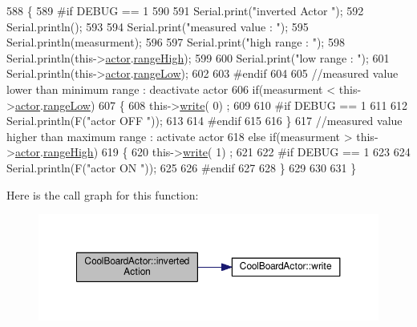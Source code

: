 \begin{DoxyCode}
588 \{
589 \textcolor{preprocessor}{#if DEBUG == 1}
590     
591     Serial.print(\textcolor{stringliteral}{"inverted Actor "});
592     Serial.println();
593 
594     Serial.print(\textcolor{stringliteral}{"measured value : "});
595     Serial.println(measurment);
596 
597     Serial.print(\textcolor{stringliteral}{"high range : "});
598     Serial.println(this->\hyperlink{class_cool_board_actor_a8f190db9f7a39fddbcef7f152da970e9}{actor}.\hyperlink{struct_cool_board_actor_1_1state_a6e5cd6c5cd44e2decfd8d4df1853f8e3}{rangeHigh});
599 
600     Serial.print(\textcolor{stringliteral}{"low range : "});
601     Serial.println(this->\hyperlink{class_cool_board_actor_a8f190db9f7a39fddbcef7f152da970e9}{actor}.\hyperlink{struct_cool_board_actor_1_1state_a43f891c9fb3bb63575c27cec860de55a}{rangeLow});
602 
603 \textcolor{preprocessor}{#endif}
604 
605     \textcolor{comment}{//measured value lower than minimum range : deactivate actor}
606     \textcolor{keywordflow}{if}(measurment < this->\hyperlink{class_cool_board_actor_a8f190db9f7a39fddbcef7f152da970e9}{actor}.\hyperlink{struct_cool_board_actor_1_1state_a43f891c9fb3bb63575c27cec860de55a}{rangeLow})
607     \{
608         this->\hyperlink{class_cool_board_actor_a958786ff01ea1056ee72c72d439f86da}{write}( 0) ;
609 
610 \textcolor{preprocessor}{    #if DEBUG == 1 }
611 
612         Serial.println(F(\textcolor{stringliteral}{"actor OFF "}));
613     
614 \textcolor{preprocessor}{    #endif}
615 
616     \}
617     \textcolor{comment}{//measured value higher than maximum range : activate actor}
618     \textcolor{keywordflow}{else} \textcolor{keywordflow}{if}(measurment > this->\hyperlink{class_cool_board_actor_a8f190db9f7a39fddbcef7f152da970e9}{actor}.\hyperlink{struct_cool_board_actor_1_1state_a6e5cd6c5cd44e2decfd8d4df1853f8e3}{rangeHigh})
619     \{
620         this->\hyperlink{class_cool_board_actor_a958786ff01ea1056ee72c72d439f86da}{write}( 1) ;
621 
622 \textcolor{preprocessor}{    #if DEBUG == 1 }
623 
624         Serial.println(F(\textcolor{stringliteral}{"actor ON "}));
625     
626 \textcolor{preprocessor}{    #endif}
627 
628     \}
629 
630 
631 \}
\end{DoxyCode}
Here is the call graph for this function\+:
\nopagebreak
\begin{figure}[H]
\begin{center}
\leavevmode
\includegraphics[width=350pt]{dc/d69/class_cool_board_actor_aae82b2e62f91be009d40f93c206f9bda_cgraph}
\end{center}
\end{figure}
